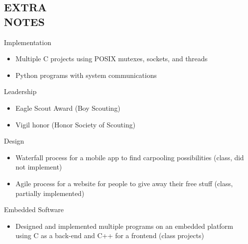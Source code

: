 \documentclass[mm]{res}
\begin{document}
\begin{resume}
\section{EXTRA \\ NOTES}     
	Implementation
		\begin{itemize}
			\item Multiple C projects using POSIX mutexes, sockets, and threads
			\item Python programs with system communications
		\end{itemize}    
            Leadership
		\begin{itemize}
			\item Eagle Scout Award (Boy Scouting)
			\item Vigil honor (Honor Society of Scouting)
		\end{itemize}
	Design
		\begin{itemize}
			\item Waterfall process for a mobile app to find carpooling possibilities (class, did not implement)
			\item Agile process for a website for people to give away their free stuff (class, partially implemented)
		\end{itemize}
	Embedded Software
		\begin{itemize}
			\item Designed and implemented multiple programs on an embedded platform using C as a back-end and C++ for a frontend (class projects)
 		\end{itemize}

\end{resume}
\end{document}
